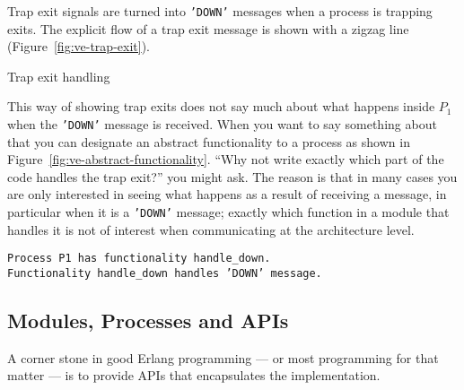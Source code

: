 \documentclass[a4paper, pdftex]{tufte-handout}
\begin{document}
Trap exit signals are turned into \texttt{'DOWN'} messages when a process is trapping
exits. The explicit flow of a trap exit message is shown with a zigzag line
(Figure~\ref{fig:ve-trap-exit}). 

\begin{marginfigure}
  \centering
  \caption{Trap exit handling}
  \label{fig:ve-trap-exit}
\end{marginfigure}

This way of showing trap exits does not say much about what happens inside $P_1$ when
the \texttt{'DOWN'} message is received. When you want to say something about that
you can designate an abstract functionality to a process as shown in
Figure~\ref{fig:ve-abstract-functionality}. ``Why not write exactly which part of the
code handles the trap exit?'' you might ask. The reason is that in many cases you are
only interested in seeing what happens as a result of receiving a message, in
particular when it is a \texttt{'DOWN'} message; exactly which function in a module
that handles it is not of interest when communicating at the architecture level.

\begin{marginfigure}
  \centering
  \caption{\texttt{Process P1 has functionality handle\_down.}\\
    \texttt{Functionality handle\_down handles 'DOWN' message.}}
  \label{fig:ve-abstract-functionality}
\end{marginfigure}


\subsection{Modules, Processes and APIs}
\label{sec:modul-proc-apis}

A corner stone in good Erlang programming --- or most programming for that matter ---
is to provide APIs that encapsulates the implementation.
\end{document}
